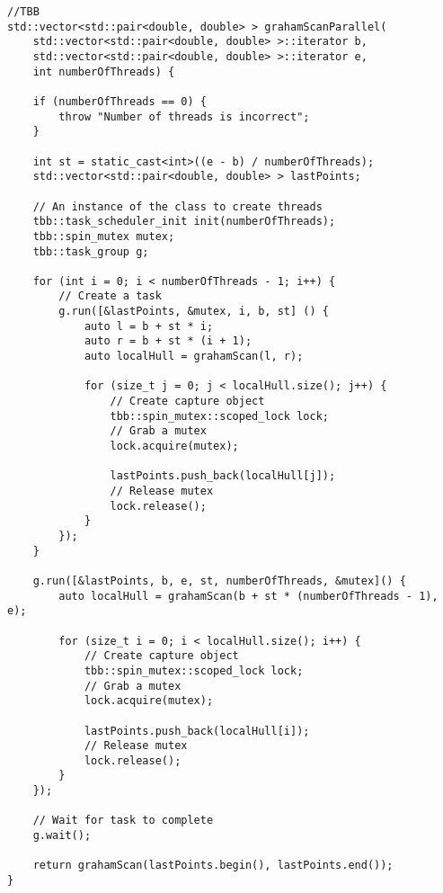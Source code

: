 \documentclass{report}
\begin{document}
\begin{lstlisting}
//TBB
std::vector<std::pair<double, double> > grahamScanParallel(
    std::vector<std::pair<double, double> >::iterator b,
    std::vector<std::pair<double, double> >::iterator e,
    int numberOfThreads) {

    if (numberOfThreads == 0) {
        throw "Number of threads is incorrect";
    }

    int st = static_cast<int>((e - b) / numberOfThreads);
    std::vector<std::pair<double, double> > lastPoints;

    // An instance of the class to create threads
    tbb::task_scheduler_init init(numberOfThreads);
    tbb::spin_mutex mutex;
    tbb::task_group g;

    for (int i = 0; i < numberOfThreads - 1; i++) {
        // Create a task
        g.run([&lastPoints, &mutex, i, b, st] () {
            auto l = b + st * i;
            auto r = b + st * (i + 1);
            auto localHull = grahamScan(l, r);

            for (size_t j = 0; j < localHull.size(); j++) {
                // Create capture object
                tbb::spin_mutex::scoped_lock lock;
                // Grab a mutex
                lock.acquire(mutex);

                lastPoints.push_back(localHull[j]);
                // Release mutex
                lock.release();
            }
        });
    }

    g.run([&lastPoints, b, e, st, numberOfThreads, &mutex]() {
        auto localHull = grahamScan(b + st * (numberOfThreads - 1), e);

        for (size_t i = 0; i < localHull.size(); i++) {
            // Create capture object
            tbb::spin_mutex::scoped_lock lock;
            // Grab a mutex
            lock.acquire(mutex);

            lastPoints.push_back(localHull[i]);
            // Release mutex
            lock.release();
        }
    });

    // Wait for task to complete
    g.wait();

    return grahamScan(lastPoints.begin(), lastPoints.end());
}
\end{lstlisting}
\end{document}

